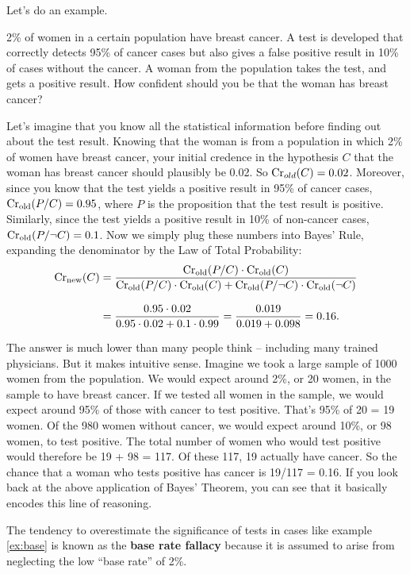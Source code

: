 Let's do an example.
\begin{example}\label{ex:base}
  2\% of women in a certain population have breast cancer. A test is
  developed that correctly detects 95\% of cancer cases but also gives
  a false positive result in 10\% of cases without the cancer. A woman
  from the population takes the test, and gets a positive result. How
  confident should you be that the woman has breast cancer?
\end{example}

Let's imagine that you know all the statistical information before
finding out about the test result. Knowing that the woman is from a
population in which 2\% of women have breast cancer, your initial
credence in the hypothesis $C$ that the woman has breast cancer should
plausibly be 0.02. So $\text{Cr}_{old}(C) = 0.02$. Moreover, since you know
that the test yields a positive result in 95\% of cancer cases,
$\text{Cr}_{\text{old}}(P/C) = 0.95$, where $P$ is the proposition that the
test result is positive. Similarly, since the test yields a positive
result in 10\% of non-cancer cases,
$\text{Cr}_{\text{old}}(P/\neg C) = 0.1$. Now we simply plug these numbers
into Bayes' Rule, expanding the denominator by the Law of Total
Probability:
%
\begin{align*}
  \text{Cr}_{\text{new}}(C) &= \frac{\text{Cr}_{\text{old}}(P/C) \cdot
  \text{Cr}_{\text{old}}(C)}{\text{Cr}_\text{old}(P/C) \cdot \text{Cr}_\text{old}(C) +
  \text{Cr}_\text{old}(P/\neg C)\cdot \text{Cr}_\text{old}(\neg C)}\\[3mm]
  &= \frac{0.95 \cdot 0.02}{0.95 \cdot 0.02 + 0.1 \cdot 0.99} = \frac{0.019}{0.019 + 0.098} = 0.16.
\end{align*}

The answer is much lower than many people think -- including many trained 
physicians. But it makes intuitive sense. Imagine we
took a large sample of 1000 women from the population. We would expect
around 2\%, or 20 women, in the sample to have breast cancer. If we
tested all women in the sample, we would expect around 95\% of those
with cancer to test positive. That's 95\% of 20 = 19 women. Of the 980
women without cancer, we would expect around 10\%, or 98 women, to
test positive. The total number of women who would test positive would
therefore be 19 + 98 = 117. Of these 117, 19 actually have cancer. So the
chance that a woman who tests positive has cancer is 19/117 = 0.16. If
you look back at the above application of Bayes' Theorem, you can see
that it basically encodes this line of reasoning.

The tendency to overestimate the significance of tests in cases like example
\ref{ex:base} is known as the \textbf{base rate fallacy} because it is
assumed to arise from neglecting the low ``base rate'' of 2\%.

